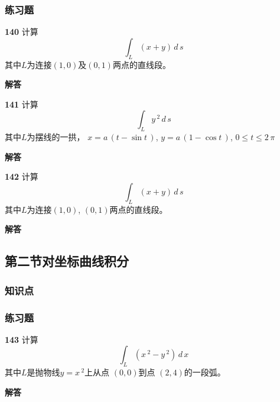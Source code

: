 \documentclass[a4paper,10pt]{article} %
\begin{document}
\subsubsection{练习题}
\par\noindent \textbf{140} \quad 计算
$$ \int_L (x+y)\,d\,s$$
其中$L$为连接$(1,0)$及$(0,1)$两点的直线段。
\par\noindent \textbf{ 解答}




\textheight


\par\noindent \textbf{141} \quad 计算
$$ \int_L y\,^2\,d\,s$$
其中$L$为摆线的一拱， $x=a\,(t-\sin t\,)$, $y=a\,(1-\cos t\,)$, $0\leq t \leq 2\,\pi$
\par\noindent \textbf{ 解答}




\textheight


\par\noindent \textbf{142} \quad 计算
$$ \int_L (x+y)\,d\,s$$
其中$L$为连接$(1,0)$, $(0,1)$两点的直线段。
\par\noindent \textbf{ 解答}




\textheight


\newpage
\subsection{第二节\quad 对坐标曲线积分}
\subsubsection{知识点}
\subsubsection{练习题}
\par\noindent \textbf{143} \quad 计算
$$ \int_L (x\,^2-y\,^2)\,d\,x$$
其中$L$是抛物线$y=x\,^2$上从点 $(0,0)$到点 $(2,4)$的一段弧。
\par\noindent \textbf{ 解答}
\end{document}
